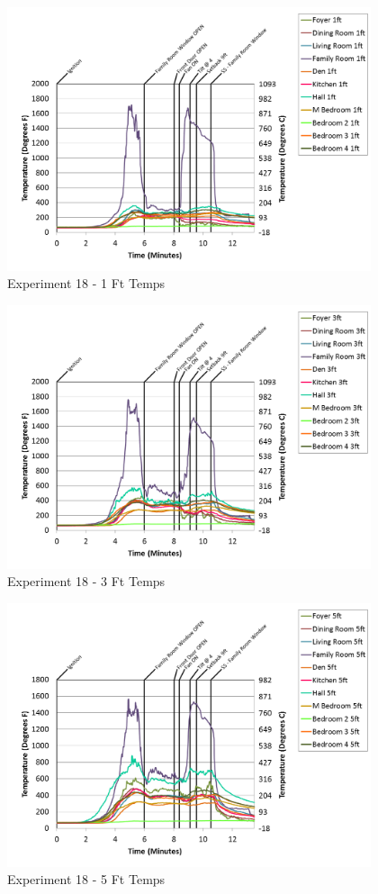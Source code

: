 \documentclass{article}
\begin{document}
\begin{appendices}
\begin{figure}[h!]
	\centering
	\includegraphics[height=3.05in]{0_Images/Results_Charts/Exp_18_Charts/1FtTemps.png}
	\caption{Experiment 18 - 1 Ft Temps}
\end{figure}


\begin{figure}[h!]
	\centering
	\includegraphics[height=3.05in]{0_Images/Results_Charts/Exp_18_Charts/3FtTemps.png}
	\caption{Experiment 18 - 3 Ft Temps}
\end{figure}

\clearpage

\begin{figure}[h!]
	\centering
	\includegraphics[height=3.05in]{0_Images/Results_Charts/Exp_18_Charts/5FtTemps.png}
	\caption{Experiment 18 - 5 Ft Temps}
\end{figure}



\end{appendices}
\end{document}
